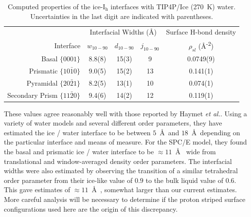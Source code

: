 \begin{table}[h]
\centering
\caption{Computed properties of the
  ice-I$_\mathrm{h}$ interfaces with TIP4P/Ice (270~K) water. Uncertainties in the last digit are indicated with
  parentheses. \label{tab:propsTIP4P}}
\begin{tabular}{r|ccc|c}  
  \toprule
  & \multicolumn{3}{c|}{Interfacial Widths (\AA)} & 
                                                    Surface H-bond
                                                    density \\
  Interface & $w_\mathrm{10-90}$ &  $d_\mathrm{10-90}$ & $j_\mathrm{10-90}$ & $\rho_{sl}$ (\AA\textsuperscript{-2}) \\ 
  \midrule
  Basal  $\{0001\}$                 & 8.8(8) & 15(3) & 9   & 0.0749(9)\\
  Prismatic  $\{10\bar{1}0\}$       & 9.0(5) & 15(2) & 13  & 0.141(1) \\
  Pyramidal  $\{20\bar{2}1\}$       & 8.2(5) & 13(1) & 10  & 0.074(1) \\
  Secondary Prism  $\{11\bar{2}0\}$ & 9.4(6) & 14(2)   & 12  & 0.119(1) \\
  \bottomrule
\end{tabular}
\end{table}

These values agree reasonably well with those reported by Haymet
\textit{et
  al.}.\cite{Karim1988,Karim1990,Hayward2001,Bryk2002,Hayward2002,Bryk2004}
Using a variety of water models and several different order
parameters, they have estimated the ice / water interface to be
between $5$~\AA~and $18$~\AA~depending on the particular interface and
means of measure.  For the SPC/E model, they found the basal and
prismatic ice / water interface to be $\approx 11$~\AA~ wide from
translational and window-averaged density order parameters. The
interfacial widths were also estimated by observing the transition of
a similar tetrahedral order parameter from their ice-like value of
$0.9$ to the bulk liquid value of $0.6$. This gave estimates of
$\approx 11$~\AA~, somewhat larger than our current estimates. More
careful analysis will be necessary to determine if the proton striped
surface configurations used here are the origin of this discrepancy.


